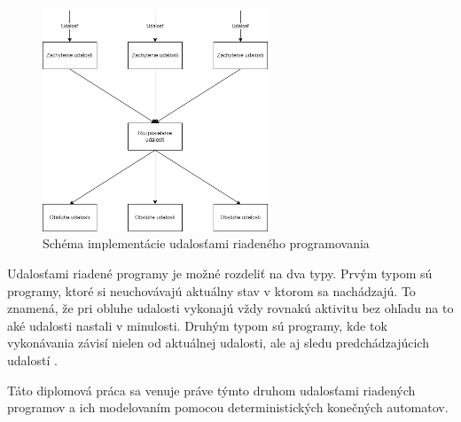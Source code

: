 \begin{figure}[!htbp]
  \centering
  \includegraphics[width=0.60\textwidth]{img/event-driven-schema.png}
  \caption{Schéma implementácie udalosťami riadeného programovania}
  \label{figure:event-driven-schema}
\end{figure}

\par
Udalosťami riadené programy je možné rozdeliť na dva typy. Prvým typom sú programy, ktoré si neuchovávajú aktuálny stav v ktorom sa nachádzajú. To znamená, že pri obluhe udalosti vykonajú vždy rovnakú aktivitu bez ohľadu na to aké udalosti nastali v minulosti. Druhým typom sú programy, kde tok vykonávania závisí nielen od aktuálnej udalosti, ale aj sledu predchádzajúcich udalostí \cite{dashEventDrivenProgramming2011}. 
\par Táto diplomová práca sa venuje práve týmto druhom udalosťami riadených programov a ich modelovaním pomocou deterministických konečných automatov.